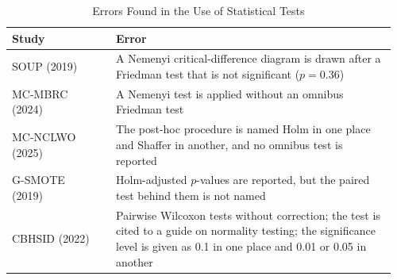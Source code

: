 \begin{table}[t]
  \caption{Errors Found in the Use of Statistical Tests}
  \label{tab:empirical-test-errors}
  \footnotesize
  \setlength{\tabcolsep}{4pt}
  \begin{tabular}{@{}>{\raggedright\arraybackslash}p{0.26\linewidth}>{\raggedright\arraybackslash}p{0.7\linewidth}@{}}
    \toprule
    Study & Error\\
    \midrule
    SOUP (2019)~\parencite{janicka2019soup} & A Nemenyi critical-difference diagram is drawn after a Friedman test that is not significant ($p = 0.36$)\\
    MC-MBRC (2024)~\parencite{ma2024mcmbrc} & A Nemenyi test is applied without an omnibus Friedman test\\
    MC-NCLWO (2025)~\parencite{tao2025mcnclwo} & The post-hoc procedure is named Holm in one place and Shaffer in another, and no omnibus test is reported\\
    G-SMOTE (2019)~\parencite{douzas2019gsmote} & Holm-adjusted $p$-values are reported, but the paired test behind them is not named\\
    CBHSID (2022)~\parencite{palli2022cbhsid} & Pairwise Wilcoxon tests without correction; the test is cited to a guide on normality testing; the significance level is given as 0.1 in one place and 0.01 or 0.05 in another\\
    \bottomrule
  \end{tabular}
\end{table}
